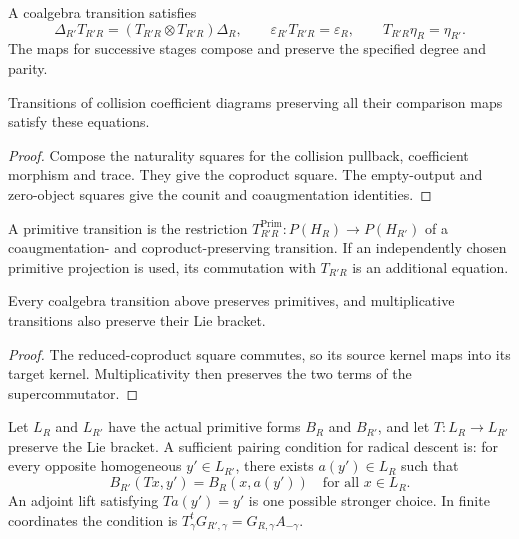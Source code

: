 \begin{definition}
\label{def:transition-hall-coproduct-preservation}
A coalgebra transition satisfies
\[
 \Delta_{R'}T_{R'R}=(T_{R'R}\otimes T_{R'R})\Delta_R,
 \qquad\varepsilon_{R'}T_{R'R}=\varepsilon_R,
 \qquad T_{R'R}\eta_R=\eta_{R'}.
\]
The maps for successive stages compose and preserve the
specified degree and parity.
\end{definition}

\begin{proposition}
\label{prop:transition-hall-coproduct-preservation-criterion}
Transitions of collision coefficient diagrams preserving all
their comparison maps satisfy these equations.
\end{proposition}

\begin{proof}
Compose the naturality squares for the collision pullback,
coefficient morphism and trace. They give the coproduct square.
The empty-output and zero-object squares give the counit and
coaugmentation identities.
\end{proof}

\begin{definition}
\label{def:transition-primitive-subspace-preservation}
A primitive transition is the restriction
$T^{\mathrm{Prim}}_{R'R}:P(H_R)\to P(H_{R'})$ of a
coaugmentation- and coproduct-preserving transition. If an
independently chosen primitive projection is used, its
commutation with $T_{R'R}$ is an additional equation.
\end{definition}

\begin{proposition}
\label{prop:transition-primitive-subspace-preservation-criterion}
Every coalgebra transition above preserves primitives, and
multiplicative transitions also preserve their Lie bracket.
\end{proposition}

\begin{proof}
The reduced-coproduct square commutes, so its source kernel
maps into its target kernel. Multiplicativity then preserves
the two terms of the supercommutator.
\end{proof}

\begin{definition}
\label{def:transition-radical-preservation}
Let $L_R$ and $L_{R'}$ have the actual primitive forms $B_R$
and $B_{R'}$, and let $T:L_R\to L_{R'}$ preserve the Lie
bracket. A sufficient pairing condition for radical descent is:
for every opposite homogeneous $y'\in L_{R'}$, there exists
$a(y')\in L_R$ such that
\[
 B_{R'}(Tx,y')=B_R(x,a(y'))\quad\text{for all }x\in L_R.
\]
An adjoint lift satisfying $Ta(y')=y'$ is one possible stronger
choice. In finite coordinates the condition is
$T_\gamma^tG_{R',\gamma}=G_{R,\gamma}A_{-\gamma}$.
\end{definition}

